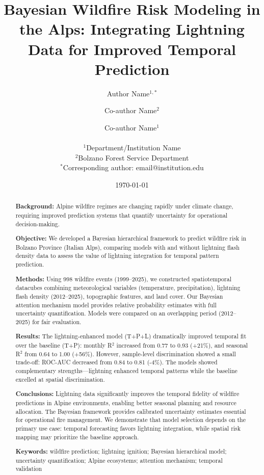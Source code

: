 \documentclass[11pt,a4paper]{article}
\title{\textbf{Bayesian Wildfire Risk Modeling in the Alps: Integrating Lightning Data for Improved Temporal Prediction}}
\author{
    Author Name$^{1,*}$ \and
    Co-author Name$^{2}$ \and
    Co-author Name$^{1}$\\
    \\
    \small $^{1}$Department/Institution Name\\
    \small $^{2}$Bolzano Forest Service Department\\
    \small $^{*}$Corresponding author: email@institution.edu
}
\date{\today}
\begin{document}
\maketitle

\begin{abstract}
\noindent\textbf{Background:} Alpine wildfire regimes are changing rapidly under climate change, requiring improved prediction systems that quantify uncertainty for operational decision-making.

\noindent\textbf{Objective:} We developed a Bayesian hierarchical framework to predict wildfire risk in Bolzano Province (Italian Alps), comparing models with and without lightning flash density data to assess the value of lightning integration for temporal pattern prediction.

\noindent\textbf{Methods:} Using 998 wildfire events (1999--2025), we constructed spatiotemporal datacubes combining meteorological variables (temperature, precipitation), lightning flash density (2012--2025), topographic features, and land cover. Our Bayesian attention mechanism model provides relative probability estimates with full uncertainty quantification. Models were compared on an overlapping period (2012--2025) for fair evaluation.

\noindent\textbf{Results:} The lightning-enhanced model (T+P+L) dramatically improved temporal fit over the baseline (T+P): monthly R$^2$ increased from 0.77 to 0.93 (+21\%), and seasonal R$^2$ from 0.64 to 1.00 (+56\%). However, sample-level discrimination showed a small trade-off: ROC-AUC decreased from 0.84 to 0.81 (-4\%). The models showed complementary strengths---lightning enhanced temporal patterns while the baseline excelled at spatial discrimination.

\noindent\textbf{Conclusions:} Lightning data significantly improves the temporal fidelity of wildfire predictions in Alpine environments, enabling better seasonal planning and resource allocation. The Bayesian framework provides calibrated uncertainty estimates essential for operational fire management. We demonstrate that model selection depends on the primary use case: temporal forecasting favors lightning integration, while spatial risk mapping may prioritize the baseline approach.

\noindent\textbf{Keywords:} wildfire prediction; lightning ignition; Bayesian hierarchical model; uncertainty quantification; Alpine ecosystems; attention mechanism; temporal validation

\end{abstract}
\end{document}
